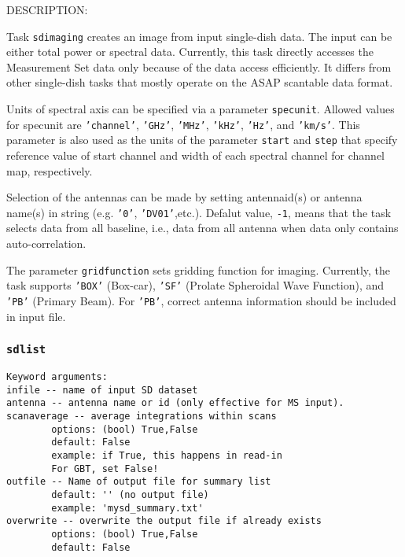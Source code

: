 DESCRIPTION:

Task {\tt sdimaging} creates an image from input single-dish data.
The input can be either total power or spectral data. Currently,
this task directly accesses the Measurement Set data only because of 
the data access efficiently. It differs from other single-dish tasks 
that mostly operate on the ASAP scantable data format.
 
Units of spectral axis can be specified via a parameter {\tt specunit}.
Allowed values for specunit are {\tt 'channel'}, {\tt 'GHz'}, {\tt 'MHz'}, {\tt 'kHz'}, {\tt 'Hz'}, 
and {\tt 'km/s'}. This parameter is also used as the units of the parameter 
{\tt start} and {\tt step} that specify reference value of start channel and width 
of each spectral channel for channel map, respectively.

Selection of the antennas can be made by setting antennaid(s) or 
antenna name(s) in string (e.g. {\tt '0'}, {\tt 'DV01'},etc.). Defalut
value, {\tt -1}, means 
that the task selects data from all baseline, i.e., data from all antenna when 
data only contains auto-correlation.

The parameter {\tt gridfunction} sets gridding function for imaging. 
Currently, the task supports {\tt 'BOX'} (Box-car), {\tt 'SF'} (Prolate Spheroidal 
Wave Function), and {\tt 'PB'} (Primary Beam). For {\tt 'PB'}, correct antenna 
information should be included in input file. 

%
 

\subsubsection{{\tt sdlist}}
\label{section:sd.sdtasks.tasks.sdlist}

\begin{verbatim}
Keyword arguments:
infile -- name of input SD dataset
antenna -- antenna name or id (only effective for MS input). 
scanaverage -- average integrations within scans
        options: (bool) True,False
        default: False
        example: if True, this happens in read-in
        For GBT, set False!
outfile -- Name of output file for summary list
        default: '' (no output file)
        example: 'mysd_summary.txt'
overwrite -- overwrite the output file if already exists
        options: (bool) True,False
        default: False
\end{verbatim}
    
